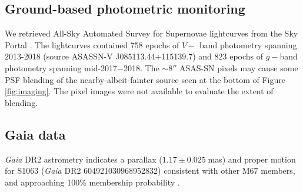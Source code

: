 \documentclass[twocolumn]{emulateapj}%
\begin{document}
\subsection{Ground-based photometric monitoring}
We retrieved All-Sky Automated Survey for Supernovae \citep[ASAS-SN][]{shappee14} lightcurves from the Sky Portal \citep{2017PASP..129j4502K}.  The lightcurves contained 758 epochs of $V-$ band photometry spanning 2013-2018 (source ASASSN-V J085113.44+115139.7) and 823 epochs of $g-$band photometry spanning mid-2017$-$2018.  The $\sim8''$ ASAS-SN pixels may cause some PSF blending of the nearby-albeit-fainter source seen at the bottom of Figure \ref{fig:imaging}.  The pixel images were not available to evaluate the extent of blending.

\subsection{Gaia data}
\emph{Gaia} DR2 astrometry \citep{2016A&A...595A...1G, 2018A&A...616A...1G} indicates a parallax ($1.17\pm0.025 \;$mas) and proper motion for S1063 (\emph{Gaia} DR2 604921030968952832) consistent with other M67 members, and approaching 100\% membership probability \citep{2018ApJ...869....9G}.
\end{document}
